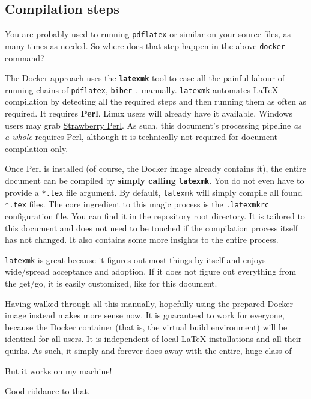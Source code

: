 \subsection{Compilation steps}
\label{ch:compilation_steps}

You are probably used to running \texttt{pdflatex} or similar on your source files,
as many times as needed.
So where does that step happen in the above \texttt{docker} command?

The Docker approach uses the \textbf{\texttt{latexmk}} tool to ease all the painful labour
of running chains of \texttt{pdflatex}, \texttt{biber} .\ manually.
\texttt{latexmk} automates \LaTeX{} compilation by detecting all the required
steps and then running them as often as required.
It requires \textbf{Perl}.
Linux users will already have it available, Windows users may grab
\href{http://strawberryperl.com/}{Strawberry Perl}.
As such, this document's processing pipeline \emph{as a whole} requires Perl,
although it is technically not required for document compilation only.

Once Perl is installed (of course, the Docker image already contains it),
the entire document can be compiled by \textbf{simply calling \texttt{latexmk}}.
You do not even have to provide a \texttt{*.tex} file argument.
By default, \texttt{latexmk} will simply compile all found \texttt{*.tex} files.
The core ingredient to this magic process is the \texttt{.latexmkrc} configuration file.
You can find it in the repository root directory.
It is tailored to this document and does not need to be touched if the compilation
process itself has not changed.
It also contains some more insights to the entire process.

\texttt{latexmk} is great because it figures out most things by itself and enjoys
wide\-/spread acceptance and adoption.
If it does not figure out everything from the get\-/go, it is easily customized,
like for this document.

Having walked through all this manually, hopefully using the prepared Docker image
instead makes more sense now.
It is guaranteed to work for everyone, because the Docker container (that is, the
virtual build environment) will be identical for all users.
It is independent of local \LaTeX{} installations and all their quirks.
As such, it simply and forever does away with the entire, huge class of
\begin{displayquote}
    But it works on my machine!
\end{displayquote}
Good riddance to that.


